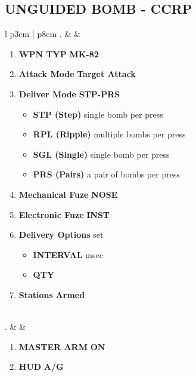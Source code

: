 \documentclass[8pt,usenames,dvipsnames,twoside]{article}
\begin{document}
		\subsection{UNGUIDED BOMB - CCRP}
		\begin{center}
			\begin{tabular}{l p{3cm} | p{8cm}}
				. &  & 
				\begin{minipage}[t]{\linewidth}
					\vspace{-7pt}
					\begin{enumerate}[label=(\alph*)]
						\item \textbf{WPN TYP} \dotfill \textbf{MK-82}
						\item \textbf{Attack Mode} \dotfill \textbf{Target Attack}
						\item \textbf{Deliver Mode} \dotfill \textbf{STP-PRS}
						\begin{itemize}
							\item \textbf{STP (Step)} single bomb per press
							\item \textbf{RPL (Ripple)} multiple bombs per press
							\item \textbf{SGL (Single)} single bomb per press
							\item \textbf{PRS (Pairs)} a pair of bombs per press
						\end{itemize}
						\item \textbf{Mechanical Fuze} \dotfill \textbf{NOSE}
						\item \textbf{Electronic Fuze} \dotfill \textbf{INST}
						\item \textbf{Delivery Options} \dotfill set 
						\begin{itemize}
							\item \textbf{INTERVAL}  msec
							\item \textbf{QTY} 
						\end{itemize}
						\item \textbf{Stations} \dotfill \textbf{Armed}
					\end{enumerate}
				\end{minipage} \\
				. &  & 
				\begin{minipage}[t]{\linewidth}
					\vspace{-7pt}
					\begin{enumerate}[label=(\alph*)]
						\item \textbf{MASTER ARM} \dotfill \textbf{ON}
						\item \textbf{HUD} \dotfill \textbf{A/G}

\end{enumerate}
\end{minipage}
\end{tabular}
\end{center}
\end{document}
